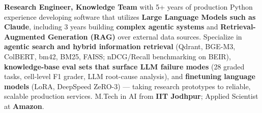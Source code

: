 \documentclass[letter,10pt]{article}
\begin{document}

\textbf{Research Engineer, Knowledge Team} with 5+ years of production Python experience developing software that utilizes \textbf{Large Language Models such as Claude}, including 3 years building \textbf{complex agentic systems} and \textbf{Retrieval-Augmented Generation (RAG)} over external data sources.
Specialize in \textbf{agentic search and hybrid information retrieval} (Qdrant, BGE-M3, ColBERT, bm42, BM25, FAISS; nDCG/Recall benchmarking on BEIR), \textbf{knowledge-base eval sets that surface LLM failure modes} (28 graded tasks, cell-level F1 grader, LLM root-cause analysis), and \textbf{finetuning language models} (LoRA, DeepSpeed ZeRO-3) --- taking research prototypes to reliable, scalable production services.
M.Tech in AI from \textbf{IIT Jodhpur}; Applied Scientist at \textbf{Amazon}.
\end{document}
